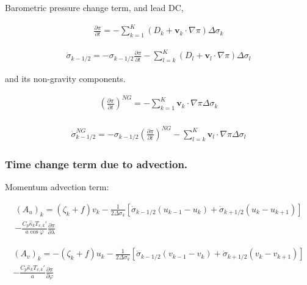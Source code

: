 Barometric pressure change term, and lead DC,

\begin{eqnarray}
  \frac{\partial \pi}{\partial t}
 = - \sum_{k=1}^{K} ( D_k + \mathbf{v}_k \cdot \nabla \pi )
       \Delta  \sigma_k
\end{eqnarray}

\begin{eqnarray}
  \dot{\sigma}_{k-1/2}
 = - \sigma_{k-1/2} \frac{\partial \pi}{\partial t}
   - \sum_{l=k}^{K} ( D_l + \mathbf{v}_l \cdot \nabla \pi )          
       \Delta  \sigma_l
\end{eqnarray}

and its non-gravity components.

\begin{eqnarray}
  \left( \frac{\partial \pi}{\partial t} \right)^{NG}
   =   - \sum_{k=1}^{K} \mathbf{v}_{k} \cdot \nabla \pi  
       \Delta  \sigma_{k}  \\
\end{eqnarray}

\begin{eqnarray}
  \dot{\sigma}^{NG}_{k-1/2}
 = - \sigma_{k-1/2} \left( \frac{\partial \pi}{\partial t} \right)^{NG}
   - \sum_{l=k}^{K} \mathbf{v}_{l} \cdot \nabla \pi
       \Delta  \sigma_{l}
\end{eqnarray}

\hypertarget{time-change-term-due-to-advection.}{%
\subsubsection{Time change term due to
advection.}\label{time-change-term-due-to-advection.}}

Momentum advection term:

\begin{eqnarray}
  (A_u)_k
    =  ( \zeta_k + f ) v_k
             - \frac{1}{2 \Delta \sigma_k}
             [   \dot{\sigma}_{k-1/2} ( u_{k-1} - u_k   )
               + \dot{\sigma}_{k+1/2} ( u_k   - u_{k+1} ) ]
            \\
           - \frac{C_{p} \hat{\kappa}_k T_{v,k}'}{ a \cos \varphi}
                  \frac{\partial \pi}{\partial \lambda}
\end{eqnarray}

\begin{eqnarray}
  (A_v)_k
    =  - ( \zeta_k + f ) u_k
             - \frac{1}{2 \Delta \sigma_k}
             [   \dot{\sigma}_{k-1/2} ( v_{k-1} - v_k   )
               + \dot{\sigma}_{k+1/2} ( v_k   - v_{k+1} ) ]
            \\
           - \frac{C_{p} \hat{\kappa}_k T_{v,k}'}{a}
             \frac{\partial \pi}{\partial \varphi}
\end{eqnarray}

